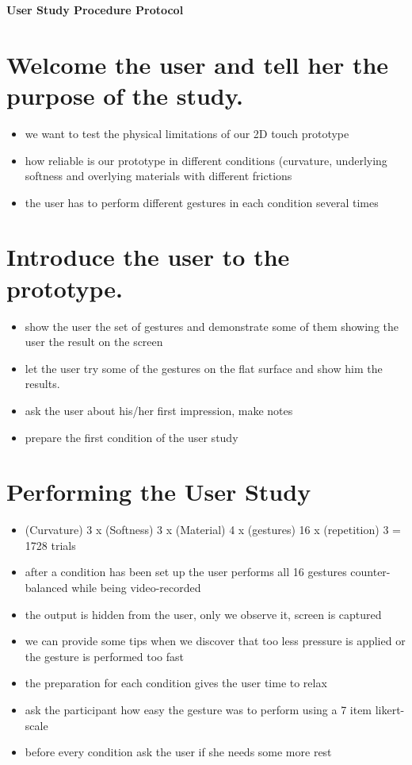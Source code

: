 \documentclass[10pt,a4paper]{article}
\begin{document}
\begin{center}
\textbf{User Study Procedure Protocol}
\end{center}
\section{Welcome the user and tell her the purpose of the study.}

\begin{itemize}
\item we want to test the physical limitations of our 2D touch prototype
\item how reliable is our prototype in different conditions (curvature, underlying softness and overlying materials with different frictions
\item the user has to perform different gestures in each condition several times
\end{itemize}

\section{Introduce the user to the prototype.}
\begin{itemize}
\item show the user the set of gestures and demonstrate some of them showing the user the result on the screen
\item let the user try some of the gestures on the flat surface and show him the results.
\item ask the user about his/her first impression, make notes
\item prepare the first condition of the user study
\end{itemize}

\section{Performing the User Study}
\begin{itemize}
\item (Curvature) 3 x (Softness) 3 x (Material) 4 x (gestures) 16 x (repetition) 3 = 1728 trials
\item after a condition has been set up the user performs all  16 gestures counter-balanced while being video-recorded
\item the output is hidden from the user, only we observe it, screen is captured
\item we can provide some tips when we discover that too less pressure is applied or the gesture is performed too fast
\item the preparation for each condition gives the user time to relax
\item ask the participant how easy the gesture was to perform using a 7 item likert-scale
\item before every condition ask the user if she needs some more rest
\end{itemize}
\end{document}

